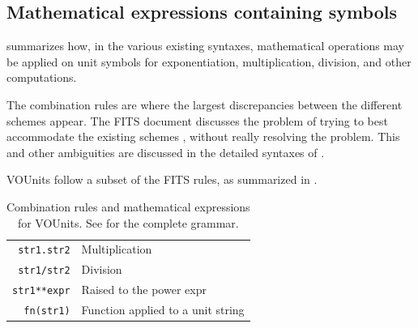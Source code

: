 \documentclass[11pt,notitlepage,onecolumn]{ivoa}
\newcommand{\unit}[1]{\texttt{\small\color{orange}#1}}
\begin{document}
\subsection{Mathematical expressions containing symbols}

 summarizes how, 
in the various existing syntaxes, mathematical operations may
be applied on unit symbols for exponentiation, multiplication,
division, and other computations.

The combination rules are where the largest discrepancies between the
different schemes appear. The FITS document discusses the problem of
trying to best accommodate the existing schemes
\cite[\S4.3.1]{pence10}, without really resolving the problem.
\label{sec:fitsquote}
This and other ambiguities are discussed in the detailed syntaxes of .

VOUnits follow a subset of the FITS rules,
as summarized in .

\begin{table}%
\begin{center}
\def\arraystretch{1.2}
\begin{tabular}{|r|l|}
\hline
\unit{str1.str2} & Multiplication \\
\unit{str1/str2} & Division \\
\unit{str1**expr} & Raised to the power expr \\
\unit{fn(str1)} & Function applied to a unit string\\
\hline
\end{tabular}
\end{center}
 \caption[Combination rules and mathematical expressions for VOUnits]
{\label{tab:VOUnitCombine}Combination rules and mathematical expressions for VOUnits.
See  for the complete grammar.}
\end{table}
\end{document}
